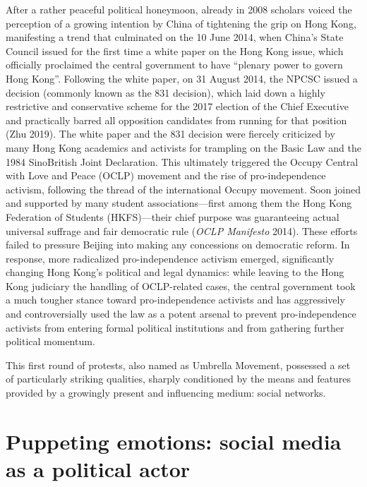 \documentclass[
  a4paper,
]{book}
\begin{document}
After a rather peaceful political honeymoon, already in 2008 scholars voiced the perception of a growing intention by China of tightening the grip on Hong Kong, manifesting a trend that culminated on the 10 June 2014, when China's State Council issued for the first time a white paper on the Hong Kong issue, which officially proclaimed the central government to have ``plenary power to govern Hong Kong''. Following the white paper, on 31 August 2014, the NPCSC issued a decision (commonly known as the 831 decision), which laid down a highly restrictive and conservative scheme for the 2017 election of the Chief Executive and practically barred all opposition candidates from running for that position {(Zhu 2019)}. The white paper and the 831 decision were fiercely criticized by many Hong Kong academics and activists for trampling on the Basic Law and the 1984 SinoBritish Joint Declaration. This ultimately triggered the Occupy Central with Love and Peace (OCLP) movement and the rise of pro-independence activism, following the thread of the international Occupy movement. Soon joined and supported by many student associations---first among them the Hong Kong Federation of Students (HKFS)---their chief purpose was guaranteeing actual universal suffrage and fair democratic rule {(\emph{{OCLP Manifesto}} 2014)}. These efforts failed to pressure Beijing into making any concessions on democratic reform. In response, more radicalized pro-independence activism emerged, significantly changing Hong Kong's political and legal dynamics: while leaving to the Hong Kong judiciary the handling of OCLP-related cases, the central government took a much tougher stance toward pro-independence activists and has aggressively and controversially used the law as a potent arsenal to prevent pro-independence activists from entering formal political institutions and from gathering further political momentum.

This first round of protests, also named as Umbrella Movement, possessed a set of particularly striking qualities, sharply conditioned by the means and features provided by a growingly present and influencing medium: social networks.

\hypertarget{puppeting-emotions-social-media-as-a-political-actor}{%
\section{Puppeting emotions: social media as a political actor}\label{puppeting-emotions-social-media-as-a-political-actor}}
\end{document}
